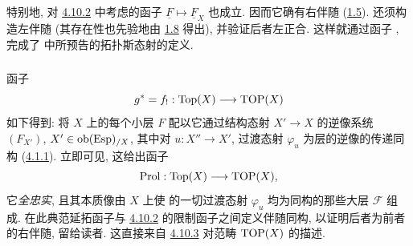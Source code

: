 特别地, 对 \hyperref[IV.subsubsec4.10.2]{4.10.2} 中考虑的函子 $\underline{F}\mapsto\underline{F}_X$ 也成立. 因而它确有右伴随 (\hyperref[IV.cor1.5]{1.5}). 还须构造左伴随 (其存在性也先验地由 \hyperref[IV.rem1.8]{1.8} 得出), 并验证后者左正合. 这样\pageoriginale 就通过函子 , 完成了  中所预告的拓扑斯态射的定义.

\subsubsection{}
函子
$$
g^{\ast}=f_{!}:\operatorname{Top}(X)\longrightarrow \operatorname{TOP}(X)
$$
如下得到: 将 $X$ 上的每个小层 $F$ 配以它通过结构态射 $X'\rightarrow X$ 的逆像系统 $(F_{X'})$, $X'\in \operatorname{ob} (\operatorname{Esp})_{/X}$, 其中对 $u:X''\rightarrow X'$, 过渡态射 $\varphi_u$ 为层的逆像的传递同构 (\hyperref[IV.subsubsec4.1.1]{4.1.1}). 立即可见, 这给出函子
$$
\operatorname{Prol}:\operatorname{Top}(X)\longrightarrow \operatorname{TOP}(X){},
$$
它\emph{全忠实}, 且其本质像由 $X$ 上使  的一切过渡态射 $\varphi_u$ 均为同构的那些大层 $ℱ$ 组成. 在此典范延拓函子与 \hyperref[IV.subsubsec4.10.2]{4.10.2} 的限制函子之间定义伴随同构, 以证明后者为前者的右伴随, 留给读者. 这直接来自 \hyperref[IV.subsubsec4.10.3]{4.10.3} 对范畴 $\operatorname{TOP}(X)$ 的描述.

